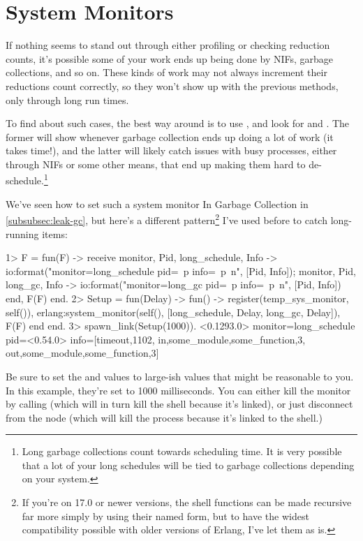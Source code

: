 \documentclass[11pt, oneside]{book}   	%
\begin{document}
\section{System Monitors}
\label{sec:cpu-system-monitors}

If nothing seems to stand out through either profiling or checking reduction counts, it's possible some of your work ends up being done by NIFs, garbage collections, and so on. These kinds of work may not always increment their reductions count correctly, so they won't show up with the previous methods, only through long run times.

To find about such cases, the best way around is to use , and look for  and . The former will show whenever garbage collection ends up doing a lot of work (it takes time!), and the latter will likely catch issues with busy processes, either through NIFs or some other means, that end up making them hard to de-schedule.\footnote{Long garbage collections count towards scheduling time. It is very possible that a lot of your long schedules will be tied to garbage collections depending on your system.}

We've seen how to set such a system monitor In Garbage Collection in \ref{subsubsec:leak-gc}, but here's a different pattern\footnote{If you're on 17.0 or newer versions, the shell functions can be made recursive far more simply by using their named form, but to have the widest compatibility possible with older versions of Erlang, I've let them as is.} I've used before to catch long-running items:

\begin{VerbatimEshell}
1> F = fun(F) ->
    receive
        {monitor, Pid, long_schedule, Info} ->
            io:format("monitor=long_schedule pid=~p info=~p~n", [Pid, Info]);
        {monitor, Pid, long_gc, Info} -> 
            io:format("monitor=long_gc pid=~p info=~p~n", [Pid, Info])
    end,
    F(F)
end.
2> Setup = fun(Delay) -> fun() -> 
     register(temp_sys_monitor, self()),
     erlang:system_monitor(self(), [{long_schedule, Delay}, {long_gc, Delay}]),
     F(F)
end end.
3> spawn_link(Setup(1000)).
<0.1293.0>
monitor=long_schedule pid=<0.54.0> info=[{timeout,1102},
                                         {in,{some_module,some_function,3}},
                                         {out,{some_module,some_function,3}}]
\end{VerbatimEshell}

Be sure to set the  and  values to large-ish values that might be reasonable to you. In this example, they're set to 1000 milliseconds. You can either kill the monitor by calling  (which will in turn kill the shell because it's linked), or just disconnect from the node (which will kill the process because it's linked to the shell.)
\end{document}
